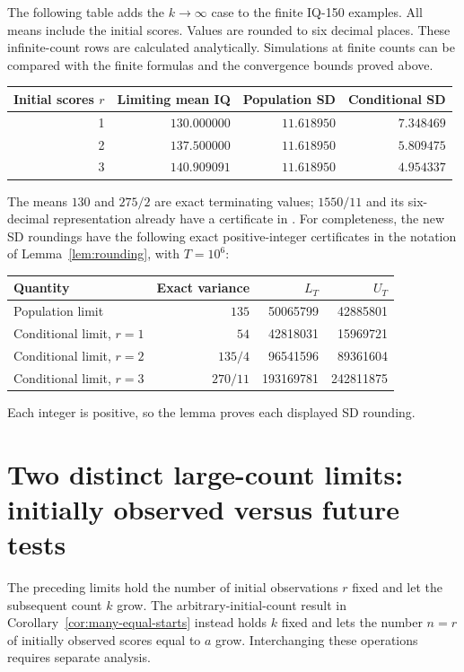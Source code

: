 The following table adds the \(k\to\infty\) case to the finite IQ-150
examples. All means include the initial scores. Values are rounded to six
decimal places.
These infinite-count rows are calculated analytically. Simulations at
finite counts can be compared with the finite formulas and the convergence
bounds proved above.
\begin{center}
\begin{tabular}{r r r r}
\hline
Initial scores \(r\) & Limiting mean IQ & Population SD & Conditional SD \\
\hline
1 & \(130.000000\) & \(11.618950\) & \(7.348469\) \\
2 & \(137.500000\) & \(11.618950\) & \(5.809475\) \\
3 & \(140.909091\) & \(11.618950\) & \(4.954337\) \\
\hline
\end{tabular}
\end{center}

The means \(130\) and \(275/2\) are exact terminating values;
\(1550/11\) and its six-decimal representation already have a certificate
in . For completeness, the new SD roundings
have the following exact positive-integer certificates in the notation of
Lemma~\ref{lem:rounding}, with \(T=10^6\):
\begin{center}
\begin{tabular}{l r r r}
\hline
Quantity & Exact variance & \(L_T\) & \(U_T\) \\
\hline
Population limit & \(135\) & 50065799 & 42885801 \\
Conditional limit, \(r=1\) & \(54\) & 42818031 & 15969721 \\
Conditional limit, \(r=2\) & \(135/4\) & 96541596 & 89361604 \\
Conditional limit, \(r=3\) & \(270/11\) & 193169781 & 242811875 \\
\hline
\end{tabular}
\end{center}
Each integer is positive, so the lemma proves each displayed SD rounding.


\section{Two distinct large-count limits: initially observed versus future tests}
\label{sec:two-count-limits}
The preceding limits hold the number of initial observations \(r\) fixed
and let the subsequent count \(k\) grow. The arbitrary-initial-count
result in Corollary~\ref{cor:many-equal-starts} instead holds \(k\)
fixed and lets the number \(n=r\) of initially observed scores equal to
\(a\) grow. Interchanging these operations requires separate analysis.

